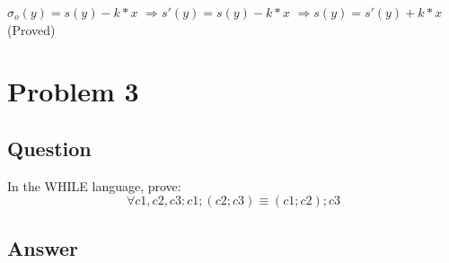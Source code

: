 \documentclass[a4paper, 11pt]{article}
\begin{document}
$\sigma_o(y) = s(y) - k*x $ \newline
$\Rightarrow s'(y) = s(y) - k*x $\newline
$\Rightarrow s(y) = s'(y) + k*x $ (Proved)

\section{Problem 3}

\subsection{Question}
In the WHILE language, prove:
$$\forall c1, c2, c3 : c1; (c2; c3) \equiv (c1; c2); c3$$

\subsection{Answer}
\end{document}
